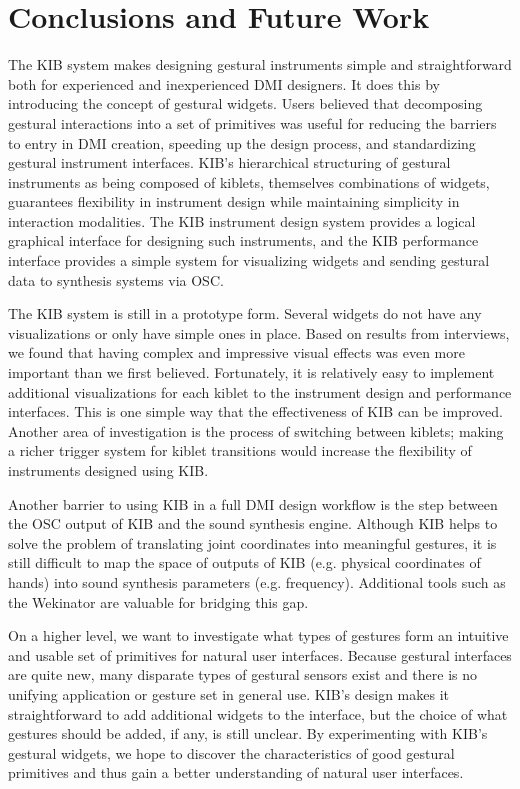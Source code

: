 \documentclass{nime-alternate}
\begin{document}
\section{Conclusions and Future Work}
The KIB system makes designing gestural instruments simple and straightforward both for experienced
and inexperienced DMI designers. It does this by introducing the concept of gestural widgets. 
Users believed that decomposing gestural interactions into a set
of primitives was useful for reducing the barriers to entry in DMI creation, speeding up the design process,
and standardizing gestural instrument interfaces. KIB's hierarchical structuring of gestural instruments as being composed
of kiblets, themselves combinations of widgets, guarantees flexibility in instrument design while maintaining simplicity
in interaction modalities. The KIB instrument design system provides a logical graphical interface for designing
such instruments, and the KIB performance interface provides a simple system for visualizing widgets and sending gestural data
to synthesis systems via OSC.

The KIB system is still in a prototype form. Several widgets do not have any visualizations or only have simple ones in place.
Based on results from interviews, we found that having complex and impressive visual effects
was even more important than we first believed. Fortunately, it is relatively easy to implement additional visualizations for 
each kiblet to the instrument design and performance interfaces. This is one simple way that the effectiveness of KIB
can be improved. Another area of investigation is the process of switching between kiblets; making a richer trigger system for kiblet
transitions would increase the flexibility of instruments designed using KIB.

Another barrier to using KIB in a full DMI design workflow is the step between the OSC output of KIB and the sound synthesis engine. Although
KIB helps to solve the problem of translating joint coordinates into meaningful gestures, it is still difficult to map the space
of outputs of KIB (e.g. physical coordinates of hands) into sound synthesis parameters (e.g. frequency). Additional tools such as
the Wekinator \cite{fiebrink2009meta} are valuable for bridging this gap.

On a higher level, we want to investigate what types of gestures form an intuitive and usable set of primitives for natural
user interfaces. Because gestural interfaces are quite new, many disparate types of gestural sensors exist and there is no
unifying application or gesture set in general use. KIB's design makes it straightforward to add
additional widgets to the interface, but the choice of what gestures should be added, if any, is still unclear. By
experimenting with KIB's gestural widgets, we hope to discover the characteristics of good
gestural primitives and thus gain a better understanding of natural user interfaces.
\end{document}

